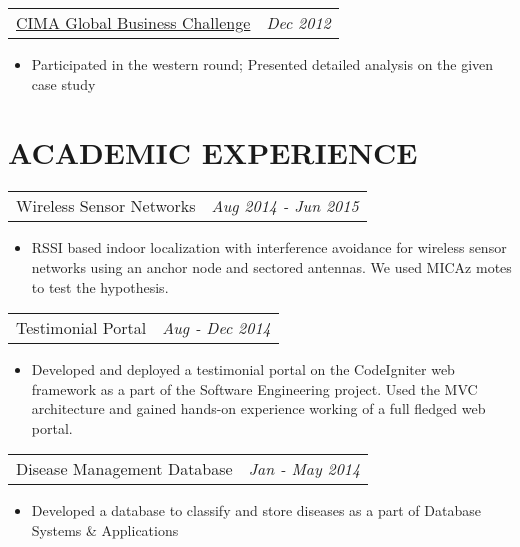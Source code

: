 \documentclass[margin]{res}
\begin{document}
\begin{resume}
\begin{itemize}
                  \end{itemize}
           \begin{tabular}{p{4.2in} r}
                  \href{http://www.cimaglobal.com/Events-and-cpd-courses/globalbusinesschallenge/}{CIMA Global Business Challenge} &  \textit{Dec 2012} 
                 \end{tabular}	
		  \begin{itemize} 
                   \item[]  Participated in the western round; Presented detailed analysis on the given case study
                  \end{itemize}
                   
\section{ACADEMIC EXPERIENCE}      
                  \begin{tabular}{p{4.2in} r}  %
                  Wireless Sensor Networks &  \textit{Aug 2014 - Jun 2015 }
                  \end{tabular}	
                   \begin{itemize} %
                    \item[] RSSI based indoor localization with interference avoidance for wireless sensor networks using an anchor node and sectored antennas. We used MICAz motes to test the hypothesis. 
		   \end{itemize} 
		   
                  \begin{tabular}{p{4.2in} r} %
                  Testimonial Portal &  \textit{Aug - Dec 2014}
                 \end{tabular}
                  \begin{itemize}					        
                   \item[] Developed and deployed a testimonial portal on the 		      CodeIgniter web framework as a part of the Software Engineering project. Used the MVC architecture and gained hands-on experience working of a full fledged web portal. 
                   
                  \end{itemize}
		 \begin{tabular}{p{4.2in} r}
                  Disease Management Database &  \textit{Jan - May 2014}
                 \end{tabular}	
		  \begin{itemize} 
                   \item[]  Developed a database to classify and store diseases as a part of Database Systems \& Applications
                  \end{itemize}
                  

\end{resume}
\end{document}
